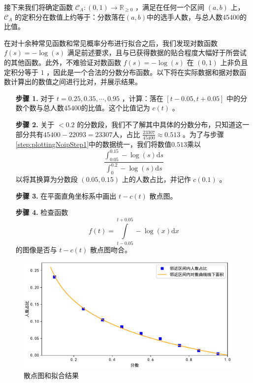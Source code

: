         接下来我们将确定函数 $\mathcal{C}_A:\left(0,1\right)\to\mathbb{R}_{\geq 0}$ ，满足在任何一个区间 $\left(a,b\right)$ 上，$\mathcal{C}_A$ 的定积分在数值上约等于：分数落在$\left(a,b\right)$中的选手人数，与总人数45400的比值。
        
        在对十余种常见函数和常见概率分布进行拟合之后，我们发现对数函数 $f(s)=-\log(s)$ 满足前述要求，且与已获得数据的贴合程度大幅好于所尝试的其他函数。此外，不难验证对数函数 $f(s)=-\log(s)$ 在 $(0,1)$ 上非负且定积分等于 $1$ ，因此是一个合法的分数分布函数。以下将在实际数据和据对数函数计算出的数值之间进行比对，并展示结果。

        \begin{enumerate}[leftmargin=6em]
            \item [\textbf{步骤 1.}] \label{step:plottingNoipStep1} 对于 $t=0.25,0.35,\cdots,0.95$ ，计算：落在 $\left[t-0.05,t+0.05\right]$ 中的分数个数与总人数45400的比值。这个比值记为 $c(t)$ 。
            \item [\textbf{步骤 2.}] 关于 $<0.2$ 的分数段，我们不了解其中具体的分数分布，只知道这一部分共有$45400-22093=23307$人，占比 $\frac{23307}{45400}\approx 0.513$ 。为了与步骤\ref{step:plottingNoipStep1}中的数据统一，我们将数值$0.513$乘以$$\frac{\int_{0.05}^{0.15}-\log(s)\mathrm{d}s}{\int_{0}^{0.2}-\log(s)\mathrm{d}s}$$以将其换算为分数段 $(0.05,0.15)$ 上的人数占比，并记作 $c(0.1)$ 。
            \item [\textbf{步骤 3.}] 在平面直角坐标系中画出 $t-c(t)$ 散点图。
            \item [\textbf{步骤 4.}] 检查函数 $$f(t)=\int\limits_{t-0.05}^{t+0.05}-\log(x)\mathrm{d}x$$ 的图像是否与 $t-c(t)$ 散点图吻合。
        \end{enumerate}

        \begin{figure}
            \centering
            \includegraphics[width=\textwidth]{fig/fittingNoipScores.pdf}
            \caption{散点图和拟合结果}
            \label{fig:fittingNoipScoresByLogCurve}
        \end{figure}

